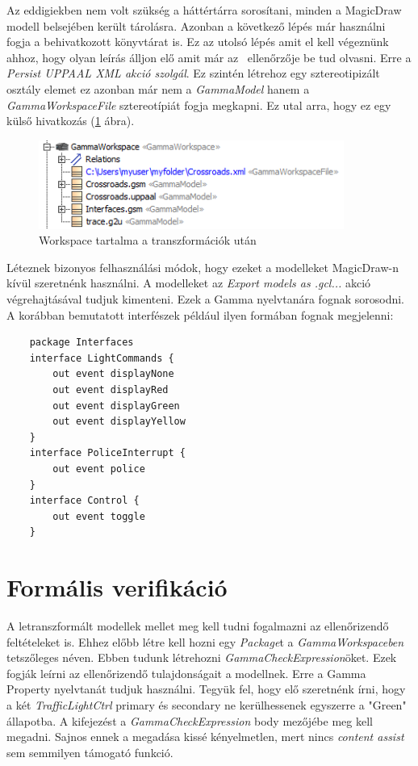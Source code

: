 Az eddigiekben nem volt szükség a háttértárra sorosítani, minden a MagicDraw modell belsejében került tárolásra. Azonban a következő lépés már használni fogja a behivatkozott könyvtárat is. Ez az utolsó lépés amit el kell végeznünk ahhoz, hogy olyan leírás álljon elő amit már az \uppaal\ ellenőrzője be tud olvasni. Erre a \emph{Persist UPPAAL XML akció szolgál}. Ez szintén létrehoz egy sztereotipizált osztály elemet ez azonban már nem a \emph{GammaModel} hanem a \emph{GammaWorkspaceFile} sztereotípiát fogja megkapni. Ez utal arra, hogy ez egy külső hivatkozás (\ref{fig:gwsfinal} ábra).

\begin{figure}[!ht]
	\centering
	\includegraphics[width=10cm, keepaspectratio]{figures/contribution/gwsfinal.png}
	\caption{Workspace tartalma a transzformációk után}
	\label{fig:gwsfinal}
\end{figure}

Léteznek bizonyos felhasználási módok, hogy ezeket a modelleket MagicDraw-n kívül szeretnénk használni. A modelleket az \emph{Export models as .gcl...} akció végrehajtásával tudjuk kimenteni. Ezek a Gamma nyelvtanára fognak sorosodni.
A korábban bemutatott interfészek például ilyen formában fognak megjelenni:

\begin{lstlisting}
	package Interfaces
	interface LightCommands {
		out event displayNone
		out event displayRed
		out event displayGreen
		out event displayYellow
	}
	interface PoliceInterrupt {
		out event police
	}
	interface Control {
		out event toggle
	}
\end{lstlisting}

\section{Formális verifikáció}
 
A letranszformált modellek mellet meg kell tudni fogalmazni az ellenőrizendő feltételeket is. Ehhez előbb létre kell hozni egy \emph{Package}t a \emph{GammaWorkspaceben} tetszőleges néven. Ebben tudunk létrehozni \emph{GammaCheckExpression}öket. Ezek fogják leírni az ellenőrizendő tulajdonságait a modellnek. Erre a Gamma Property nyelvtanát tudjuk használni. Tegyük fel, hogy elő szeretnénk írni, hogy a két \emph{TrafficLightCtrl} primary és secondary ne kerülhessenek egyszerre a "Green" állapotba. A kifejezést a \emph{GammaCheckExpression}  body mezőjébe meg kell megadni. Sajnos ennek a megadása kissé kényelmetlen, mert nincs \emph{content assist} sem semmilyen támogató funkció.

